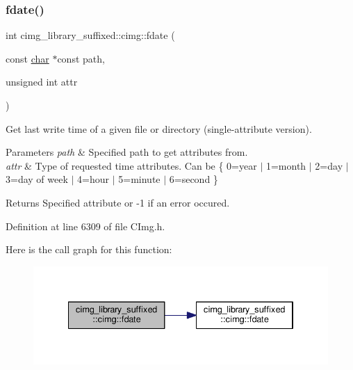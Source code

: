 \subsubsection{\texorpdfstring{fdate()}{fdate()}\hspace{0.1cm}{\footnotesize\ttfamily [2/2]}}
{\footnotesize\ttfamily int cimg\+\_\+library\+\_\+suffixed\+::cimg\+::fdate (\begin{DoxyParamCaption}\item[{const \hyperlink{classchar}{char} $\ast$const}]{path,  }\item[{unsigned int}]{attr }\end{DoxyParamCaption})\hspace{0.3cm}{\ttfamily [inline]}}



Get last write time of a given file or directory (single-\/attribute version). 


\begin{DoxyParams}{Parameters}
{\em path} & Specified path to get attributes from. \\
\hline
{\em attr} & Type of requested time attributes. Can be \{ 0=year $\vert$ 1=month $\vert$ 2=day $\vert$ 3=day of week $\vert$ 4=hour $\vert$ 5=minute $\vert$ 6=second \} \\
\hline
\end{DoxyParams}
\begin{DoxyReturn}{Returns}
Specified attribute or -\/1 if an error occured. 
\end{DoxyReturn}


Definition at line 6309 of file C\+Img.\+h.

Here is the call graph for this function\+:
\nopagebreak
\begin{figure}[H]
\begin{center}
\leavevmode
\includegraphics[width=334pt]{d4/d9b/namespacecimg__library__suffixed_1_1cimg_a1db87aed0dbd0fd7a0e709894e9f645d_cgraph}
\end{center}
\end{figure}
\mbox{\label{namespacecimg__library__suffixed_1_1cimg_a0f3577978081461118330fc3ecd4b9db}} 
